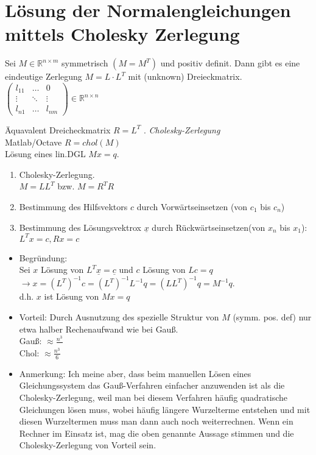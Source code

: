 \documentclass[ngerman]{tudscrreprt}
\begin{document}
\section{Lösung der Normalengleichungen mittels Cholesky Zerlegung} 
Sei $ M \in \mathbb{R}^{n\times m}$ symmetrisch $ (M= M^T)$ und positiv definit. Dann gibt es eine eindeutige Zerlegung $ M = L \cdot L^T$ mit (unknown) Dreieckmatrix.
$
\begin{pmatrix}
  l_{11} & \dots  & 0 \\
  \vdots  & \ddots & \vdots\\
  l_{n1} & \dots & l_{nm}
\end{pmatrix} 
\in \mathbb{R}^{n\times n}
$

Äquavalent Dreicheckmatrix $R = L^T$ .
\textit{Cholesky-Zerlegung} \\
Matlab/Octave $R=chol(M)$
\\
Lösung eines lin.DGL $Mx=q.$\\
\begin{enumerate}
\item Cholesky-Zerlegung.\\
		$M=LL^T$ bzw. $M=R^T R$\\
\item Bestimmung des Hilfsvektors $c$ durch Vorwärtseinsetzen (von $c_1$ bis $c_n$)
\item Bestimmung des Lösungsvektrox $\underline{x}$ durch Rückwärtseinsetzen(von $x_n $ bis $x_1$): \\$L^T x =c, Rx=c$
\end{enumerate}
\begin{itemize}
\item Begründung:\\
Sei $x$ Lösung von $L^T \underline{x} =\underline{c}$ und $c$ Lösung von $Lc =q$
\\
$\rightarrow x=(L^T)^{-1} c = (L^T)^{-1} L^{-1} q = (L L^T)^{-1} q = M^{-1} q.$ \\
d.h. $x $ ist Lösung von $Mx=q$\\

\item Vorteil: Durch Ausnutzung des spezielle Struktur von $M$ (symm. pos. def) nur etwa halber Rechenaufwand wie bei Gauß.\\

Gauß: $\approx \frac{n^3}{}$
\\
Chol: $ \approx \frac{n^3}{6}$  \\

\item Anmerkung:
Ich meine aber, dass beim manuellen Lösen eines Gleichungssystem das Gauß-Verfahren einfacher anzuwenden ist als die Cholesky-Zerlegung, weil man bei diesem Verfahren häufig quadratische Gleichungen lösen muss, wobei häufig längere Wurzelterme entstehen und mit diesen Wurzeltermen muss man dann auch noch weiterrechnen. Wenn ein Rechner im Einsatz ist, mag die oben genannte Aussage stimmen und die Cholesky-Zerlegung von Vorteil sein.
\end{itemize}
\end{document}
